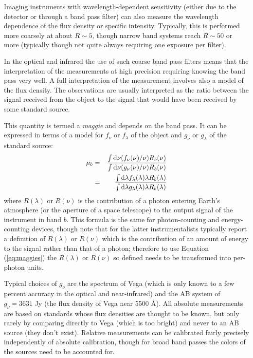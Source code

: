 Imaging instruments with wavelength-dependent sensitivity (either due
to the detector or through a band pass filter) can also measure the
wavelength dependence of the flux density or specific
intensity. Typically, this is performed more coarsely at about $R\sim
5$, though narrow band systems reach $R\sim 50$ or more (typically
though not quite always requiring one exposure per filter).

In the optical and infrared the use of such coarse band pass filters
means that the interpretation of the measurements at high precision
requiring knowing the band pass very well. A full interpretation of
the measurement involves also a model of the flux density. The
observations are usually interpreted as the ratio between the signal
received from the object to the signal that would have been received
by some standard source.

This quantity is termed a {\it maggie} and depends on the band
pass. It can be expressed in terms of a model for $f_\nu$ or
$f_\lambda$ of the object and $g_\nu$ or $g_\lambda$ of the standard
source:
\begin{eqnarray}
\label{eq:maggies}
  \mu_b &=&
  \frac{\int {\rm d}\nu (f_\nu(\nu)/\nu) R_b(\nu)}
       {\int {\rm d}\nu (g_\nu(\nu)/\nu) R_b(\nu)} \cr
       &=&
  \frac{\int {\rm d}\lambda f_\lambda(\lambda) \lambda R_b(\lambda) }
       {\int {\rm d}\lambda g_\lambda(\lambda) \lambda R_b(\lambda)} 
\end{eqnarray}
where $R(\lambda)$ or $R(\nu)$ is the contribution of a photon
entering Earth's atmosphere (or the aperture of a space telescope) to
the output signal of the instrument in band $b$. This formula is the
same for photon-counting and energy-counting devices, though note that
for the latter instrumentalists typically report a definition of
$R(\lambda)$ or $R(\nu)$ which is the contribution of an amount of
energy to the signal rather than that of a photon; therefore to use
Equation (\ref{eq:maggies}) the $R(\lambda)$ or $R(\nu)$ so defined
needs to be transformed into per-photon units.

Typical choices of $g_\nu$ are the spectrum of Vega (which is only
known to a few percent accuracy in the optical and near-infrared) and
the AB system of $g_\nu = 3631$ Jy (the flux density of Vega near 5500
\AA).  All absolute measurements are based on standards whose flux
densities are thought to be known, but only rarely by comparing
directly to Vega (which is too bright) and never to an AB source (they
don't exist). Relative measurements can be calibrated fairly precisely
independently of absolute calibration, though for broad band passes
the colors of the sources need to be accounted for.

